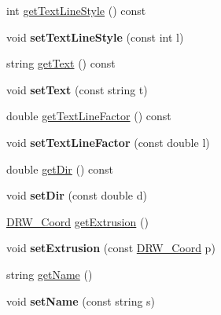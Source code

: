 \begin{DoxyCompactItemize}
\item 
int \hyperlink{classDRW__Dimension_a5774fd11d8745a32e6c2a94a697a3584}{get\-Text\-Line\-Style} () const 
\item 
\hypertarget{classDRW__Dimension_aac34cdbb585f7773882743eebb2c53a8}{void {\bfseries set\-Text\-Line\-Style} (const int l)}\label{classDRW__Dimension_aac34cdbb585f7773882743eebb2c53a8}

\item 
string \hyperlink{classDRW__Dimension_a353b67d805913fdfe12d393a75101d4a}{get\-Text} () const 
\item 
\hypertarget{classDRW__Dimension_ae762b7c8f299c9d90c14f8709dd67eb9}{void {\bfseries set\-Text} (const string t)}\label{classDRW__Dimension_ae762b7c8f299c9d90c14f8709dd67eb9}

\item 
double \hyperlink{classDRW__Dimension_a92f00fef72a9f5de2058360f7ce4d518}{get\-Text\-Line\-Factor} () const 
\item 
\hypertarget{classDRW__Dimension_a9980fe1feec082c5a7499a6b1734fcbf}{void {\bfseries set\-Text\-Line\-Factor} (const double l)}\label{classDRW__Dimension_a9980fe1feec082c5a7499a6b1734fcbf}

\item 
double \hyperlink{classDRW__Dimension_afce2fe039bfbff29ef8dca9ab5d4d41c}{get\-Dir} () const 
\item 
\hypertarget{classDRW__Dimension_a62a37e43242e5f766f09f6e5665b39b3}{void {\bfseries set\-Dir} (const double d)}\label{classDRW__Dimension_a62a37e43242e5f766f09f6e5665b39b3}

\item 
\hyperlink{classDRW__Coord}{D\-R\-W\-\_\-\-Coord} \hyperlink{classDRW__Dimension_acbbe026791231ce980ad2adcf0a259c2}{get\-Extrusion} ()
\item 
\hypertarget{classDRW__Dimension_ab33520becea162a4a9ce23a0e3b01dd7}{void {\bfseries set\-Extrusion} (const \hyperlink{classDRW__Coord}{D\-R\-W\-\_\-\-Coord} p)}\label{classDRW__Dimension_ab33520becea162a4a9ce23a0e3b01dd7}

\item 
string \hyperlink{classDRW__Dimension_a0d0defb9cb9648267450c3c815783551}{get\-Name} ()
\item 
\hypertarget{classDRW__Dimension_a00619087e89266540ecf924e8477fd9d}{void {\bfseries set\-Name} (const string s)}\label{classDRW__Dimension_a00619087e89266540ecf924e8477fd9d}

\end{DoxyCompactItemize}
